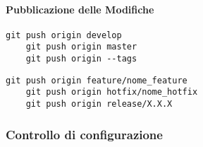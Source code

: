     \paragraph*{Pubblicazione delle Modifiche}
    
    \begin{lstlisting}[style=code]
    git push origin develop
    git push origin master
    git push origin --tags
    \end{lstlisting}
    
    \begin{lstlisting}[style=code]
    git push origin feature/nome_feature
    git push origin hotfix/nome_hotfix
    git push origin release/X.X.X
    \end{lstlisting}
\subsubsection{Controllo di configurazione}
